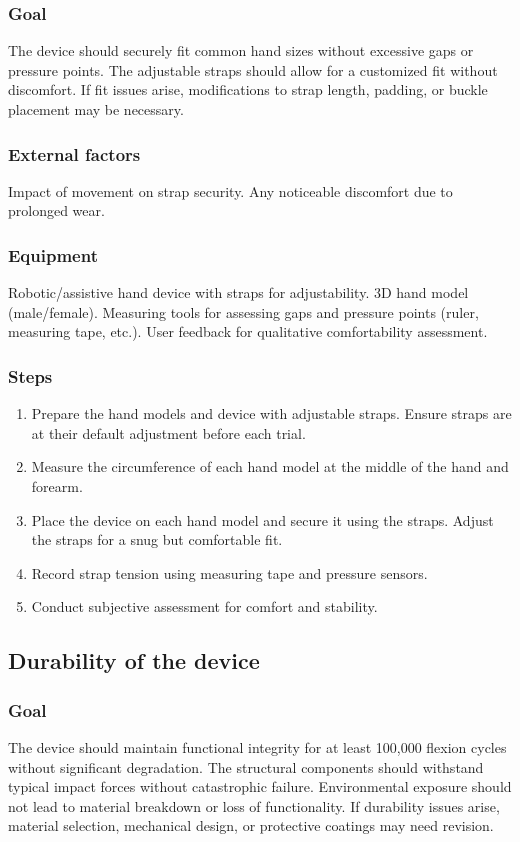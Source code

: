 \documentclass{article}
\begin{document}
\subsubsection{Goal} The device should securely fit common hand sizes without excessive gaps or pressure
points. The adjustable straps should allow for a customized fit without discomfort. If fit issues arise, modifications to strap length, padding, or buckle placement may be
necessary.
\subsubsection{External factors}
Impact of movement on strap security. Any noticeable discomfort due to prolonged wear.
\subsubsection{Equipment}
Robotic/assistive hand device with straps for adjustability. 3D hand model (male/female). Measuring tools for assessing gaps and pressure points (ruler, measuring tape, etc.). User feedback for qualitative comfortability assessment.
\subsubsection{Steps}
\begin{enumerate}
    \item Prepare the hand models and device with adjustable straps. Ensure straps are at their default adjustment before each trial.
    \item Measure the circumference of each hand model at the middle of the hand and forearm.
    \item Place the device on each hand model and secure it using the straps. Adjust the straps for a snug but comfortable fit.
    \item Record strap tension using measuring tape and pressure sensors.
    \item Conduct subjective assessment for comfort and stability.
\end{enumerate}

\subsection{Durability of the device}
\subsubsection{Goal} The device should maintain functional integrity for at least 100,000 flexion cycles without significant degradation. The structural components should withstand typical impact forces without catastrophic failure. Environmental exposure should not lead to material breakdown or loss of functionality. If durability issues arise, material selection, mechanical design, or protective coatings may need revision.
\end{document}
